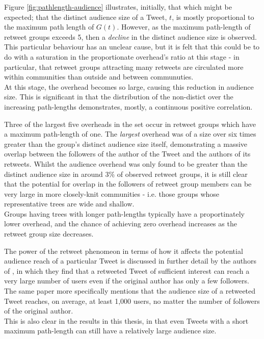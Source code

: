 Figure \ref{fig:pathlength-audience} illustrates, initially, that which might be expected; that the distinct audience size of a Tweet, $t$, is mostly proportional to the maximum path length of $G(t)$. However, as the maximum path-length of retweet groups exceeds 5, then a \textit{decline} in the distinct audience size is observed. This particular behaviour has an unclear cause, but it is felt that this could be to do with a saturation in the proportionate overhead's ratio at this stage - in particular, that retweet groups attracting many retweets are circulated more within communities than outside and between communuties.\\
At this stage, the overhead becomes so large, causing this reduction in audience size. This is significant in that the distribution of the non-distict over the increasing path-lengths demonstrates, mostly, a continuous positive correlation.

Three of the largest five overheads in the set occur in retweet groups which have a maximum path-length of one. The \textit{largest} overhead was of a size over six times greater than the group's distinct audience size itself, demonstrating a massive overlap between the followers of the author of the Tweet and the authors of its retweets. Whilst the audience overhead was only found to be greater than the distinct audience size in around 3\% of observed retweet groups, it is still clear that the potential for overlap in the followers of retweet group members can be very large in more closely-knit communities - i.e. those groups whose representative trees are wide and shallow.\\
Groups having trees with longer path-lengths typically have a proportinately lower overhead, and the chance of achieving zero overhead increases as the retweet group size decreases.

The power of the retweet phenomeon in terms of how it affects the potential audience reach of a particular Tweet is discussed in further detail by the authors of \cite{kwak10}, in which they find that a retweeted Tweet of sufficient interest can reach a very large number of users even if the original author has only a few followers. The same paper more specifically mentions that the audience size of a retweeted Tweet reaches, on average, at least 1,000 users, no matter the number of followers of the original author.\\
This is also clear in the results in this thesis, in that even Tweets with a short maximum path-length can still have a relatively large audience size.


